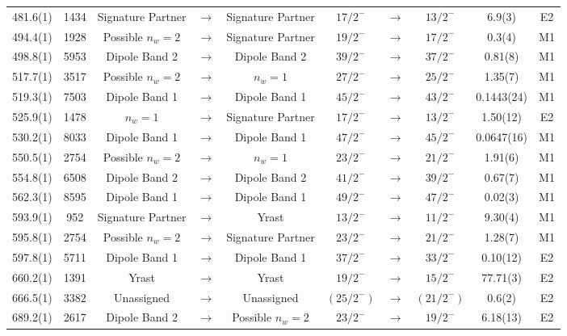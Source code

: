 \begin{landscape}
\begin{center}
\begin{longtable}{|c|c|ccc|ccc|c|c|}
 481.6(1) & 1434 & Signature Partner & $ \rightarrow $ & Signature Partner & $ 17/2^{-} $ & $ \rightarrow $ & $ 13/2^{-} $ & 6.9(3) & E2 \\
 494.4(1) & 1928 & Possible $n_w=2$ & $ \rightarrow $ & Signature Partner & $ 19/2^{-} $ & $ \rightarrow $ & $ 17/2^{-} $ & 0.3(4) & M1 \\
 498.8(1) & 5953 & Dipole Band 2 & $ \rightarrow $ & Dipole Band 2 & $ 39/2^{-} $ & $ \rightarrow $ & $ 37/2^{-} $ & 0.81(8) & M1 \\
 517.7(1) & 3517 & Possible $n_w=2$ & $ \rightarrow $ & $n_w=1$ & $ 27/2^{-} $ & $ \rightarrow $ & $ 25/2^{-} $ & 1.35(7) & M1 \\
 519.3(1) & 7503 & Dipole Band 1 & $ \rightarrow $ & Dipole Band 1 & $ 45/2^{-} $ & $ \rightarrow $ & $ 43/2^{-} $ & 0.1443(24) & M1 \\
 525.9(1) & 1478 & $n_w=1$ & $ \rightarrow $ & Signature Partner & $ 17/2^{-} $ & $ \rightarrow $ & $ 13/2^{-} $ & 1.50(12) & E2 \\
 530.2(1) & 8033 & Dipole Band 1 & $ \rightarrow $ & Dipole Band 1 & $ 47/2^{-} $ & $ \rightarrow $ & $ 45/2^{-} $ & 0.0647(16) & M1 \\
 550.5(1) & 2754 & Possible $n_w=2$ & $ \rightarrow $ & $n_w=1$ & $ 23/2^{-} $ & $ \rightarrow $ & $ 21/2^{-} $ & 1.91(6) & M1 \\
 554.8(1) & 6508 & Dipole Band 2 & $ \rightarrow $ & Dipole Band 2 & $ 41/2^{-} $ & $ \rightarrow $ & $ 39/2^{-} $ & 0.67(7) & M1 \\
 562.3(1) & 8595 & Dipole Band 1 & $ \rightarrow $ & Dipole Band 1 & $ 49/2^{-} $ & $ \rightarrow $ & $ 47/2^{-} $ & 0.02(3) & M1 \\
 593.9(1) & 952 & Signature Partner & $ \rightarrow $ & Yrast & $ 13/2^{-} $ & $ \rightarrow $ & $ 11/2^{-} $ & 9.30(4) & M1 \\
 595.8(1) & 2754 & Possible $n_w=2$ & $ \rightarrow $ & Signature Partner & $ 23/2^{-} $ & $ \rightarrow $ & $ 21/2^{-} $ & 1.28(7) & M1 \\
 597.8(1) & 5711 & Dipole Band 1 & $ \rightarrow $ & Dipole Band 1 & $ 37/2^{-} $ & $ \rightarrow $ & $ 33/2^{-} $ & 0.10(12) & E2 \\
 660.2(1) & 1391 & Yrast & $ \rightarrow $ & Yrast & $ 19/2^{-} $ & $ \rightarrow $ & $ 15/2^{-} $ & 77.71(3) & E2 \\
 666.5(1) & 3382 & Unassigned & $ \rightarrow $ & Unassigned & $ (25/2^{-}) $ & $ \rightarrow $ & $ (21/2^{-}) $ & 0.6(2) & E2 \\
 689.2(1) & 2617 & Dipole Band 2 & $ \rightarrow $ & Possible $n_w=2$ & $ 23/2^{-} $ & $ \rightarrow $ & $ 19/2^{-} $ & 6.18(13) & E2 \\

\end{longtable}
\end{center}
\end{landscape}
